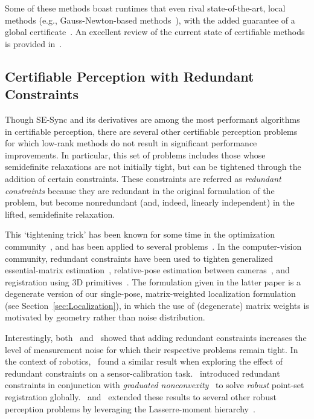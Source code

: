 \documentclass[lettersize,journal]{IEEEtran}
\begin{document}
Some of these methods boast runtimes that even rival state-of-the-art, local methods (e.g., Gauss-Newton-based methods~\cite{gtsam}), with the added guarantee of a global certificate~\cite{juricComparisonGraphOptimization2021, brialesCartanSyncFastGlobal2017}. An excellent review of the current state of certifiable methods is provided in~\cite{rosenAdvancesInferenceRepresentation2021}.

\subsection{Certifiable Perception with Redundant Constraints}\label{sec:RedundantConstraints}

Though SE-Sync and its derivatives are among the most performant algorithms in certifiable perception, there are several other certifiable perception problems for which low-rank methods do not result in significant performance improvements. In particular, this set of problems includes those whose semidefinite relaxations are not initially tight, but can be tightened through the addition of certain constraints. These constraints are referred as \emph{redundant constraints} because they are redundant in the original formulation of the problem, but become nonredundant (and, indeed, linearly independent) in the lifted, semidefinite relaxation.

This `tightening trick' has been known for some time in the optimization community~\cite{nesterovSemidefiniteProgrammingRelaxations2000}, and has been applied to several problems~\cite{ruizUsingRedundancyStrengthen2011, parriloSemidefiniteProgrammingRelaxations2003a}. In the computer-vision community, redundant constraints have been used to tighten generalized essential-matrix estimation~\cite{zhaoCertifiablyGloballyOptimal2020}, relative-pose estimation between cameras~\cite{garcia-salgueroTighterRelaxationRelative2022, brialesCertifiablyGloballyOptimal2018}, and registration using 3D primitives~\cite{brialesConvexGlobal3D2017}. The formulation given in the latter paper is a degenerate version of our single-pose, matrix-weighted localization formulation (see Section~\ref{sec:Localization}), in which the use of (degenerate) matrix weights is motivated by geometry rather than noise distribution. 

Interestingly, both~\cite{garcia-salgueroTighterRelaxationRelative2022} and~\cite{brialesCertifiablyGloballyOptimal2018} showed that adding redundant constraints increases the level of measurement noise for which their respective problems remain tight. In the context of robotics,~\cite{wiseCertifiablyOptimalMonocular2020} found a similar result when exploring the effect of redundant constraints on a sensor-calibration task.~\cite{yangTEASERFastCertifiable2021} introduced redundant constraints in conjunction with \emph{graduated nonconvexity}~\cite{yangGraduatedNonConvexityRobust2020} to solve \emph{robust} point-set registration globally.~\cite{yangOneRingRule2020} and~\cite{yangCertifiablyOptimalOutlierRobust2023} extended these results to several other robust perception problems by leveraging the Lasserre-moment hierarchy~\cite{henrionMomentSOSHierarchyLectures2021,lasserreGlobalOptimizationPolynomials2001}. 
\end{document}
